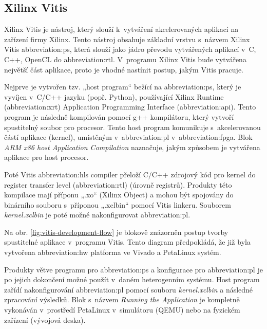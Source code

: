 \documentclass[a4paper, twoside, 11pt]{article}
\begin{document}
		\subsection{Xilinx Vitis}\label{subsec:xilinx-vitis}
		Xilinx Vitis je nástroj, který slouží k~vytváření akcelerovaných aplikací na zařízení firmy Xilinx. Tento nástroj obsahuje základní vrstvu s~názvem Xilinx Vitis \gls{abbreviation:ps}, která slouží jako jádro převodu vytvářených aplikací v~C, C++, OpenCL do \gls{abbreviation:rtl}. V~programu Xilinx Vitis bude vytvářena největší část aplikace, proto je vhodné nastínit postup, jakým Vitis pracuje.
		\par
		Nejprve je vytvořen tzv. „host program“ bežící na \gls{abbreviation:ps}, který je vyvíjen v~C/C++ jazyku (popř. Python), používající Xilinx Runtime (\gls{abbreviation:xrt}) Application Programming Interface (\gls{abbreviation:api}). Tento program je následně kompilován pomocí g++ kompilátoru, který vytvoří spustitelný soubor pro procesor. Tento host program komunikuje s~akcelerovanou částí aplikace (kernel), umístěným v~\gls{abbreviation:pl} v~\gls{abbreviation:fpga}. Blok \textit{ARM x86 host Application Compilation} naznačuje, jakým způsobem je vytvářena aplikace pro host procesor. \cite{vitis-unified-software-platform-documentation-2022}\par
		Poté Vitis \gls{abbreviation:hls} compiler přeloží C/C++ zdrojový kód pro kernel do register transfer level (\gls{abbreviation:rtl}) (úrovně registrů). Produkty této kompilace mají příponu „.xo“ (Xilinx Object) a mohou být spojovány do binárního souboru s~příponou „.xclbin“ pomocí Vitis linkeru. Souborem \textit{kernel.xclbin} je poté možné nakonfigurovat \gls{abbreviation:pl}.\cite{vitis-unified-software-platform-documentation-2022}\par
		Na obr. \ref{fig:vitis-development-flow} je blokově znázorněn postup tvorby spustitelné aplikace v~programu Vitis. Tento diagram předpokládá, že již byla vytvořena \gls{abbreviation:hw} platforma ve Vivado a PetaLinux systém.\par
		Produkty větve programu pro \gls{abbreviation:ps} a konfigurace pro \gls{abbreviation:pl} je po jejich dokončení možné použít v~daném heterogenním systému. Host program zařídí nakonfigurování \gls{abbreviation:pl} pomocí souboru \textit{kernel.xclbin} a následné zpracování výsledků. Blok s~názvem \textit{Running the Application} je kompletně vykonáván v~prostředí PetaLinux v~simulátoru (QEMU) nebo na fyzickém zařízení (vývojová deska).
\end{document}
